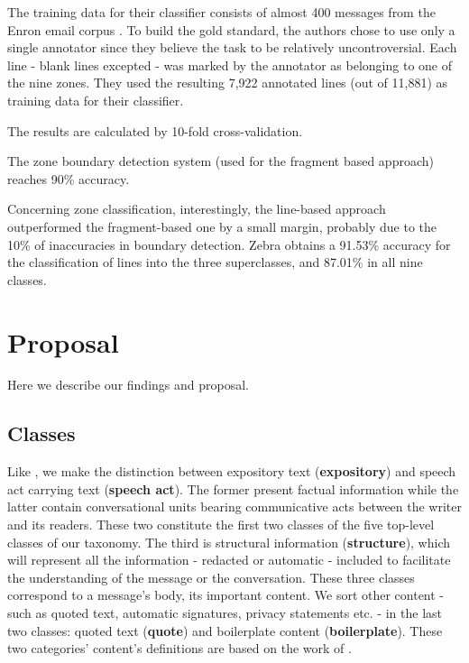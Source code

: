 \documentclass[11pt]{article}
\begin{document}
The training data for their classifier consists of almost 400 messages from the Enron email corpus \cite{klimt2004enron}. To build the gold standard, the authors chose to use only a single annotator since they believe the task to be relatively uncontroversial. Each line - blank lines excepted - was marked by the annotator as belonging to one of the nine zones. They used the resulting 7,922 annotated lines (out of 11,881) as training data for their classifier.

The results are calculated by 10-fold cross-validation. 

The zone boundary detection system (used for the fragment based approach) reaches 90\% accuracy.

Concerning zone classification, interestingly, the line-based approach outperformed the fragment-based one by a small margin, probably due to the 10\% of inaccuracies in boundary detection. Zebra obtains a 91.53\% accuracy for the classification of lines into the three superclasses, and 87.01\% in all nine classes.

\section{Proposal}

Here we describe our findings and proposal.

\subsection{Classes}

Like \cite{qadir2011classifying}, we make the distinction between expository text (\textbf{expository}) and speech act carrying text (\textbf{speech act}). The former present factual information while the latter contain conversational units bearing communicative acts between the writer and its readers. These two constitute the first two classes of the five top-level classes of our taxonomy. The third is structural information (\textbf{structure}), which will represent all the information - redacted or automatic - included to facilitate the understanding of the message or the conversation. These three classes correspond to a message's body, its important content. We sort other content - such as quoted text, automatic signatures, privacy statements etc. - in the last two classes: quoted text (\textbf{quote}) and boilerplate content (\textbf{boilerplate}). These two categories' content's definitions are based on the work of \cite{lampert2009segmenting}.
\end{document}
